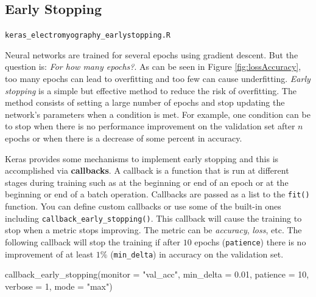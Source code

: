 \documentclass[
  11pt,
]{krantz}
\makeatletter
\newenvironment{Shaded}{\begin{snugshade}}{\end{snugshade}}
\newcommand{\AttributeTok}[1]{\textcolor[rgb]{0.61,0.61,0.61}{#1}}
\newcommand{\DecValTok}[1]{\textcolor[rgb]{0.06,0.06,0.06}{#1}}
\newcommand{\FloatTok}[1]{\textcolor[rgb]{0.06,0.06,0.06}{#1}}
\newcommand{\FunctionTok}[1]{\textcolor[rgb]{0,0,0}{#1}}
\newcommand{\NormalTok}[1]{#1}
\newcommand{\StringTok}[1]{\textcolor[rgb]{0.5,0.5,0.5}{#1}}
\newenvironment{kframe}{%
\medskip{}
\setlength{\fboxsep}{.8em}
 \def\at@end@of@kframe{}%
 \ifinner\ifhmode%
  \def\at@end@of@kframe{\end{minipage}}%
  \begin{minipage}{\columnwidth}%
 \fi\fi%
 \def\FrameCommand##1{\hskip\@totalleftmargin \hskip-\fboxsep
 \colorbox{shadecolor}{##1}\hskip-\fboxsep
     \hskip-\linewidth \hskip-\@totalleftmargin \hskip\columnwidth}%
 \MakeFramed {\advance\hsize-\width
   \@totalleftmargin\z@ \linewidth\hsize
   \@setminipage}}%
 {\par\unskip\endMakeFramed%
 \at@end@of@kframe}
\newenvironment{rmdblock}[1]
  {
  \begin{itemize}
  \renewcommand{\labelitemi}{
    \raisebox{-.7\height}[0pt][0pt]{
      {\setkeys{Gin}{width=3em,keepaspectratio}\texttt{[image: images/icons/\#1]}}
    }
  }
  \setlength{\fboxsep}{1em}
  \begin{kframe}
  \item
  }
  {
  \end{kframe}
  \end{itemize}
  }
\newenvironment{rmdfolder}
  {\begin{rmdblock}{folder}}
  {\end{rmdblock}}
\makeatother
\begin{document}
\hypertarget{early-stopping}{%
\subsection{Early Stopping}\label{early-stopping}}

\begin{rmdfolder}
\texttt{keras\_electromyography\_earlystopping.R}
\end{rmdfolder}

Neural networks are trained for several epochs using gradient descent. But the question is: \emph{For how many epochs?}. As can be seen in Figure \ref{fig:lossAccuracy}, too many epochs can lead to overfitting and too few can cause underfitting. \emph{Early stopping} is a simple but effective method to reduce the risk of overfitting. The method consists of setting a large number of epochs and stop updating the network's parameters when a condition is met. For example, one condition can be to stop when there is no performance improvement on the validation set after \(n\) epochs or when there is a decrease of some percent in accuracy.

Keras provides some mechanisms to implement early stopping and this is accomplished via \textbf{callbacks}. A callback is a function that is run at different stages during training such as at the beginning or end of an epoch or at the beginning or end of a batch operation. Callbacks are passed as a list to the \texttt{fit()} function. You can define custom callbacks or use some of the built-in ones including \texttt{callback\_early\_stopping()}. This callback will cause the training to stop when a metric stops improving. The metric can be \emph{accuracy}, \emph{loss}, etc. The following callback will stop the training if after \(10\) epochs (\texttt{patience}) there is no improvement of at least \(1\%\) (\texttt{min\_delta}) in accuracy on the validation set.

\begin{Shaded}
\begin{Highlighting}[]
\FunctionTok{callback\_early\_stopping}\NormalTok{(}\AttributeTok{monitor =} \StringTok{"val\_acc"}\NormalTok{,}
                        \AttributeTok{min\_delta =} \FloatTok{0.01}\NormalTok{,}
                        \AttributeTok{patience =} \DecValTok{10}\NormalTok{,}
                        \AttributeTok{verbose =} \DecValTok{1}\NormalTok{,}
                        \AttributeTok{mode =} \StringTok{"max"}\NormalTok{)}
\end{Highlighting}
\end{Shaded}
\end{document}
